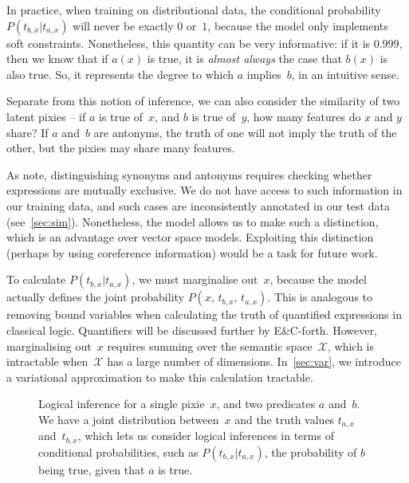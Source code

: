 \documentclass[11pt]{article}
\begin{document}
In practice, when training on distributional data,
the conditional probability ${P(t_{b,x}|t_{a,x})}$ will never be exactly $0$ or~$1$,
because the model only implements soft constraints.
Nonetheless, this quantity can be very informative:
if it is $0.999$, then we know that if $a(x)$ is true,
it is \textit{almost always} the case that $b(x)$ is also true.
So, it represents the degree to which $a$ implies~$b$, in an intuitive sense.

Separate from this notion of inference,
we can also consider the similarity of two latent pixies --
if $a$ is true of~$x$, and $b$ is true of~$y$,
how many features do $x$ and $y$ share?
If $a$ and~$b$ are antonyms,
the truth of one will not imply the truth of the other,
but the pixies may share many features.

As  note,
distinguishing synonyms and antonyms
requires checking whether expressions are mutually exclusive.
We do not have access to such information in our training data,
and such cases are inconsistently annotated in our test data (see~\cref{sec:sim}).
Nonetheless, the model allows us to make such a distinction,
which is an advantage over vector space models.
Exploiting this distinction (perhaps by using coreference information)
would be a task for future work.

To calculate ${P(t_{b,x}|t_{a,x})}$, we must marginalise out~$x$,
because the model actually defines the joint probability ${P(x,\,t_{b,x},\,t_{a,x})}$.
This is analogous to removing bound variables
when calculating the truth of quantified expressions in classical logic.
Quantifiers will be discussed further by E\&C-forth.
However, marginalising out~$x$ requires summing over the semantic space~$\mathcal{X}$,
which is intractable when~$\mathcal{X}$ has a large number of dimensions.
In~\cref{sec:var}, we introduce a variational approximation
to make this calculation tractable.

\begin{figure}
\centering

\vspace*{-3mm}

\caption{Logical inference for a single pixie~$x$,
and two predicates $a$ and~$b$.
We have a joint distribution between~$x$
and the truth values $t_{a,x}$ and~$t_{b,x}$,
which lets us consider logical inferences in terms of conditional probabilities,
such as $P(t_{b,x}|t_{a,x})$, the probability of $b$ being true, given that $a$ is true.
}
\label{fig:log-one}

\end{figure}
\end{document}
